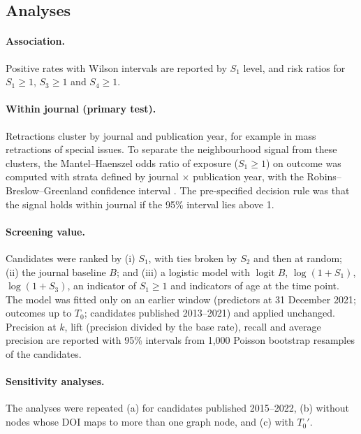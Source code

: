 \documentclass[pdflatex,sn-basic]{sn-jnl}
\begin{document}
\subsection{Analyses}
\paragraph{Association.} Positive rates with Wilson intervals \citep{wilson1927} are reported by $S_1$ level, and risk
ratios for $S_1 \ge 1$, $S_3 \ge 1$ and $S_4 \ge 1$.

\paragraph{Within journal (primary test).} Retractions cluster by journal and publication year, for example in
mass retractions of special issues. To separate the neighbourhood signal from these clusters, the Mantel--Haenszel odds
ratio \citep{mantel1959} of exposure ($S_1 \ge 1$) on outcome was computed with strata defined by journal $\times$
publication year, with the Robins--Breslow--Greenland confidence interval \citep{robins1986estimator}. The
pre-specified decision rule was that the signal holds within journal if the 95\% interval lies above 1.

\paragraph{Screening value.} Candidates were ranked by (i) $S_1$, with ties broken by $S_2$ and then at random;
(ii) the journal baseline $B$; and (iii) a logistic model with $\operatorname{logit} B$, $\log(1+S_1)$,
$\log(1+S_3)$, an indicator of $S_1 \ge 1$ and indicators of age at the time point. The model was fitted only on an
earlier window (predictors at 31 December 2021; outcomes up to $T_0$; candidates published 2013--2021) and applied
unchanged. Precision at $k$, lift (precision divided by the base rate), recall and average precision
\citep{saito2015prc} are reported with 95\% intervals from 1,000 Poisson bootstrap resamples of the candidates.

\paragraph{Sensitivity analyses.} The analyses were repeated (a) for candidates published 2015--2022, (b) without
nodes whose DOI maps to more than one graph node, and (c) with $T_0'$.
\end{document}
